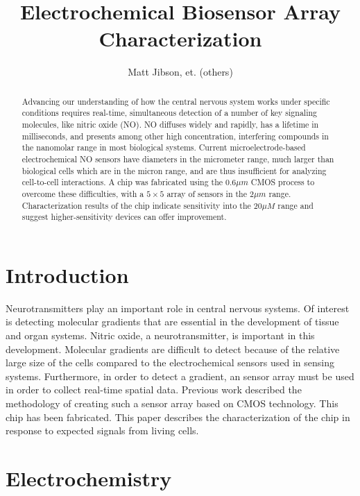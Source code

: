 \documentclass[twocolumn]{article}
\begin{document}
\title{Electrochemical Biosensor Array Characterization}
\author{Matt Jibson, et. (others)}

\maketitle{}

\begin{abstract}

Advancing our understanding of how the central nervous system works under specific conditions requires real-time, simultaneous detection of a number of key signaling molecules, like nitric oxide (NO). NO diffuses widely and rapidly, has a lifetime in milliseconds, and presents among other high concentration, interfering compounds in the nanomolar range in most biological systems. Current microelectrode-based electrochemical NO sensors have diameters in the micrometer range, much larger than biological cells which are in the micron range, and are thus insufficient for analyzing cell-to-cell interactions. A chip was fabricated using the $0.6\mu m$ CMOS process to overcome these difficulties, with a $5 \times 5$ array of sensors in the 2$\mu m$ range. Characterization results of the chip indicate sensitivity into the 20$\mu M$ range and suggest higher-sensitivity devices can offer improvement.

\end{abstract}

\section{Introduction}

Neurotransmitters play an important role in central nervous systems. Of interest is detecting molecular gradients that are essential in the development of tissue and organ systems. Nitric oxide, a neurotransmitter, is important in this development. Molecular gradients are difficult to detect because of the relative large size of the cells compared to the electrochemical sensors used in sensing systems. Furthermore, in order to detect a gradient, an sensor array must be used in order to collect real-time spatial data. Previous work described the methodology of creating such a sensor array based on CMOS technology. This chip has been fabricated. This paper describes the characterization of the chip in response to expected signals from living cells.

\section{Electrochemistry}
\end{document}
